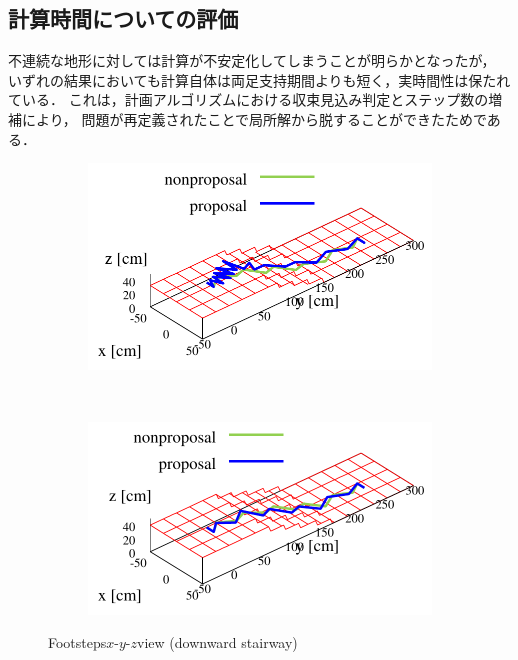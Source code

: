 \documentclass[autodetect-engine,dvipdfmx-if-dvi,ja=standard,a4j,jbase=11pt,magstyle=nomag*]{bxjsreport}
\begin{document}
\subsection{計算時間についての評価}
不連続な地形に対しては計算が不安定化してしまうことが明らかとなったが，
いずれの結果においても計算自体は両足支持期間よりも短く，実時間性は保たれている．
これは，計画アルゴリズムにおける収束見込み判定とステップ数の増補により，
問題が再定義されたことで局所解から脱することができたためである．

\begin{figure}[pt]%
    \centering%
    \begin{subfigure}[c]{\linewidth}
        \centering%
        \includegraphics[width=0.9\linewidth, clip]{./figure/sim_hrp2_stair_downbad_xyz.pdf}%
        \label{fig:sim_hrp2_stair_downbad_xyz}%
    \end{subfigure}\\ %
    \vfil%
    \begin{subfigure}[c]{\linewidth}
        \centering%
        \includegraphics[width=0.9\linewidth, clip]{./figure/sim_hrp2_stair_down_xyz.pdf}%
        \label{fig:sim_hrp2_stair_downgood_xyz}%
    \end{subfigure}%
    \caption{Footsteps$x$-$y$-$z$view (downward stairway)}%
    \label{fig:sim_hrp2_stair_down}%
\end{figure}
\end{document}
